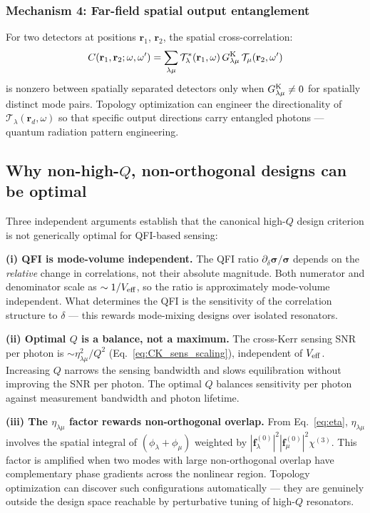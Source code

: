 \documentclass[12pt]{article}
\newcommand{\Keldysh}{{\rm K}}
\begin{document}
\subsubsection*{Mechanism 4: Far-field spatial output entanglement}

For two detectors at positions $\mathbf{r}_1$, $\mathbf{r}_2$, the
spatial cross-correlation:
\begin{equation}
  C(\mathbf{r}_1,\mathbf{r}_2;\omega,\omega') =
  \sum_{\lambda\mu}
  \mathcal{T}_\lambda^*(\mathbf{r}_1,\omega)\,G^\Keldysh_{\lambda\mu}\,
  \mathcal{T}_\mu(\mathbf{r}_2,\omega')
  \label{eq:spatial_corr}
\end{equation}
is nonzero between spatially separated detectors only when
$G^\Keldysh_{\lambda\mu}\neq 0$ for spatially distinct mode pairs.
Topology optimization can engineer the directionality of
$\mathcal{T}_\lambda(\mathbf{r}_d,\omega)$ so that specific output
directions carry entangled photons --- quantum radiation pattern
engineering.

\subsection{Why non-high-$Q$, non-orthogonal designs can be optimal}

Three independent arguments establish that the canonical high-$Q$
design criterion is not generically optimal for QFI-based sensing:

\textbf{(i) QFI is mode-volume independent.}  The QFI ratio
$\partial_\delta\boldsymbol{\sigma}/\boldsymbol{\sigma}$ depends on the
\emph{relative} change in correlations, not their absolute magnitude.
Both numerator and denominator scale as $\sim 1/V_{\rm eff}$, so the
ratio is approximately mode-volume independent.  What determines the
QFI is the sensitivity of the correlation structure to $\delta$ ---
this rewards mode-mixing designs over isolated resonators.

\textbf{(ii) Optimal $Q$ is a balance, not a maximum.}
The cross-Kerr sensing SNR per photon is $\sim\eta_{\lambda\mu}^2/Q^2$
(Eq.~\ref{eq:CK_sens_scaling}), independent of $V_{\rm eff}$.
Increasing $Q$ narrows the sensing bandwidth and slows equilibration
without improving the SNR per photon.  The optimal $Q$ balances
sensitivity per photon against measurement bandwidth and photon lifetime.

\textbf{(iii) The $\eta_{\lambda\mu}$ factor rewards non-orthogonal overlap.}
From Eq.~\eqref{eq:eta}, $\eta_{\lambda\mu}$ involves the spatial
integral of $(\phi_\lambda+\phi_\mu)$ weighted by
$|\mathbf{f}^{(0)}_\lambda|^2|\mathbf{f}^{(0)}_\mu|^2\chi^{(3)}$.  This
factor is amplified when two modes with large non-orthogonal overlap
have complementary phase gradients across the nonlinear region.
Topology optimization can discover such configurations automatically ---
they are genuinely outside the design space reachable by perturbative
tuning of high-$Q$ resonators.
\end{document}
